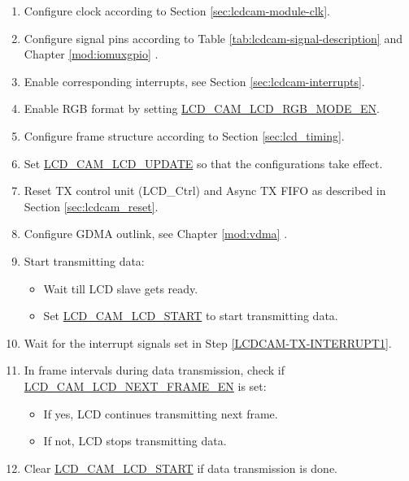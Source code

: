 \documentclass[main\_\_EN.tex]{subfiles}
\begin{document}
\begin{enumerate}
    \item Configure clock according to Section \ref{sec:lcdcam-module-clk}.

    \item Configure signal pins according to Table \ref{tab:lcdcam-signal-description} and Chapter \ref{mod:iomuxgpio} \textit{}.

    \item \label{LCDCAM-TX-INTERRUPT1}Enable corresponding interrupts, see Section \ref{sec:lcdcam-interrupts}.

    \item Enable RGB format by setting \hyperref[fielddesc:LCDCAMLCDRGBMODEEN]{LCD\_CAM\_LCD\_RGB\_MODE\_EN}.

    \item Configure frame structure according to Section \ref{sec:lcd_timing}.

    \item Set \hyperref[fielddesc:LCDCAMLCDUPDATE]{LCD\_CAM\_LCD\_UPDATE} so that the configurations take effect.

    \item Reset TX control unit (LCD\_Ctrl) and Async TX FIFO as described in Section \ref{sec:lcdcam_reset}.

    \item Configure GDMA outlink, see Chapter \ref{mod:vdma} \textit{}.

    \item Start transmitting data:
    \begin{itemize}
        \item Wait till LCD slave gets ready.
        \item Set \hyperref[fielddesc:LCDCAMLCDSTART]{LCD\_CAM\_LCD\_START} to start transmitting data.
    \end{itemize}

    \item Wait for the interrupt signals set in Step \ref{LCDCAM-TX-INTERRUPT1}.

    \item In frame intervals during data transmission, check if \hyperref[fielddesc:LCDCAMLCDNEXTFRAMEEN]{LCD\_CAM\_LCD\_NEXT\_FRAME\_EN} is set:
    \begin{itemize}
        \item If yes, LCD continues transmitting next frame.
        \item If not, LCD stops transmitting data.
    \end{itemize}
    \item Clear \hyperref[fielddesc:LCDCAMLCDSTART]{LCD\_CAM\_LCD\_START} if data transmission is done.
\end{enumerate}
\end{document}
